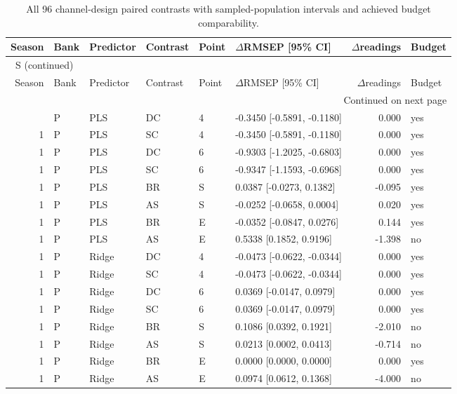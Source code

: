 \documentclass[10pt,a4paper]{article}
\renewcommand{\thetable}{S\arabic{table}}
\begin{document}
\begingroup\footnotesize
\setlength{\tabcolsep}{3.5pt}
\renewcommand{\arraystretch}{1.10}
\begin{longtable}{rlllllrl}
\caption{All 96 channel-design paired contrasts with sampled-population intervals and achieved budget comparability.}\label{tab:v3paired}\\
\toprule
Season & Bank & Predictor & Contrast & Point & $\Delta$RMSEP [95\% CI] & $\Delta$readings & Budget \\
\midrule
\endfirsthead
\multicolumn{8}{l}{\tablename~\thetable{} (continued)}\\
\toprule
Season & Bank & Predictor & Contrast & Point & $\Delta$RMSEP [95\% CI] & $\Delta$readings & Budget \\
\midrule
\endhead
\midrule
\multicolumn{8}{r}{Continued on next page}\\
\endfoot
\bottomrule
\endlastfoot
1 & P & PLS & DC & 4 & -0.3450 [-0.5891, -0.1180] & 0.000 & yes \\
1 & P & PLS & SC & 4 & -0.3450 [-0.5891, -0.1180] & 0.000 & yes \\
1 & P & PLS & DC & 6 & -0.9303 [-1.2025, -0.6803] & 0.000 & yes \\
1 & P & PLS & SC & 6 & -0.9347 [-1.1593, -0.6968] & 0.000 & yes \\
1 & P & PLS & BR & S & 0.0387 [-0.0273, 0.1382] & -0.095 & yes \\
1 & P & PLS & AS & S & -0.0252 [-0.0658, 0.0004] & 0.020 & yes \\
1 & P & PLS & BR & E & -0.0352 [-0.0847, 0.0276] & 0.144 & yes \\
1 & P & PLS & AS & E & 0.5338 [0.1852, 0.9196] & -1.398 & no \\
1 & P & Ridge & DC & 4 & -0.0473 [-0.0622, -0.0344] & 0.000 & yes \\
1 & P & Ridge & SC & 4 & -0.0473 [-0.0622, -0.0344] & 0.000 & yes \\
1 & P & Ridge & DC & 6 & 0.0369 [-0.0147, 0.0979] & 0.000 & yes \\
1 & P & Ridge & SC & 6 & 0.0369 [-0.0147, 0.0979] & 0.000 & yes \\
1 & P & Ridge & BR & S & 0.1086 [0.0392, 0.1921] & -2.010 & no \\
1 & P & Ridge & AS & S & 0.0213 [0.0002, 0.0413] & -0.714 & no \\
1 & P & Ridge & BR & E & 0.0000 [0.0000, 0.0000] & 0.000 & yes \\
1 & P & Ridge & AS & E & 0.0974 [0.0612, 0.1368] & -4.000 & no \\

\end{longtable}
\end{document}
